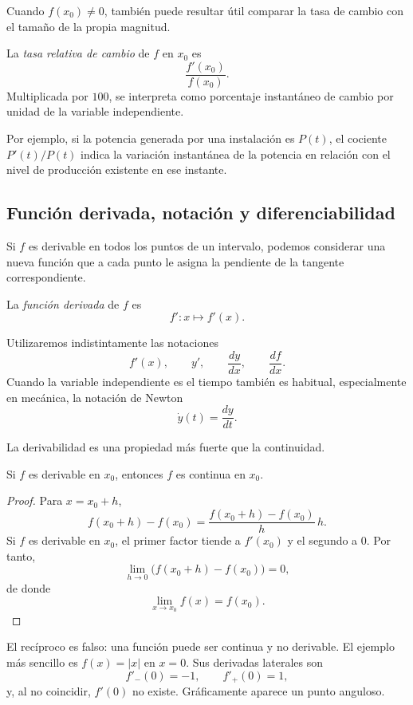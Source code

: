 Cuando $f(x_0)\neq0$, también puede resultar útil comparar la tasa de cambio con el tamaño de la propia magnitud.

\begin{definition}
La \emph{tasa relativa de cambio} de $f$ en $x_0$ es
\[
\frac{f'(x_0)}{f(x_0)}.
\]
Multiplicada por $100$, se interpreta como porcentaje instantáneo de cambio por unidad de la variable independiente.
\end{definition}

Por ejemplo, si la potencia generada por una instalación es $P(t)$, el cociente $P'(t)/P(t)$ indica la variación instantánea de la potencia en relación con el nivel de producción existente en ese instante.

\subsection{Función derivada, notación y diferenciabilidad}

Si $f$ es derivable en todos los puntos de un intervalo, podemos considerar una nueva función que a cada punto le asigna la pendiente de la tangente correspondiente.

\begin{definition}
La \emph{función derivada} de $f$ es
\[
f':x\longmapsto f'(x).
\]
\end{definition}

Utilizaremos indistintamente las notaciones
\[
f'(x),
\qquad
y',
\qquad
\frac{dy}{dx},
\qquad
\frac{df}{dx}.
\]
Cuando la variable independiente es el tiempo también es habitual, especialmente en mecánica, la notación de Newton
\[
\dot y(t)=\frac{dy}{dt}.
\]

La derivabilidad es una propiedad más fuerte que la continuidad.

\begin{theorem}
Si $f$ es derivable en $x_0$, entonces $f$ es continua en $x_0$.
\end{theorem}

\begin{proof}
Para $x=x_0+h$,
\[
f(x_0+h)-f(x_0)
=
\frac{f(x_0+h)-f(x_0)}{h}\,h.
\]
Si $f$ es derivable en $x_0$, el primer factor tiende a $f'(x_0)$ y el segundo a $0$. Por tanto,
\[
\lim_{h\to0}\bigl(f(x_0+h)-f(x_0)\bigr)=0,
\]
de donde
\[
\lim_{x\to x_0}f(x)=f(x_0).
\]
\end{proof}

El recíproco es falso: una función puede ser continua y no derivable. El ejemplo más sencillo es $f(x)=|x|$ en $x=0$. Sus derivadas laterales son
\[
f'_-(0)=-1,
\qquad
f'_+(0)=1,
\]
y, al no coincidir, $f'(0)$ no existe. Gráficamente aparece un punto anguloso.

